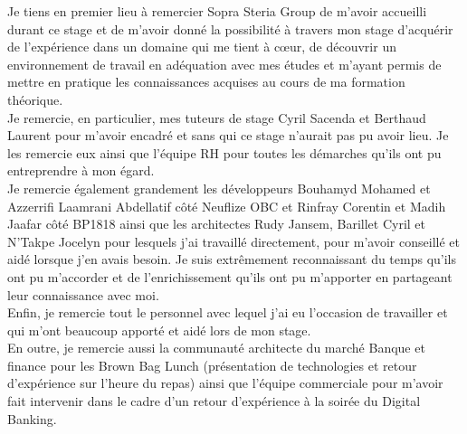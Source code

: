 Je tiens en premier lieu à remercier Sopra Steria Group de m’avoir accueilli durant ce stage et de m’avoir donné la possibilité à travers mon stage d’acquérir de l’expérience dans un domaine qui me tient à cœur, de découvrir un environnement de travail en adéquation avec mes études et m’ayant permis de mettre en pratique les connaissances acquises au cours de ma formation théorique. \\

Je remercie, en particulier, mes tuteurs de stage Cyril Sacenda et Berthaud Laurent pour m’avoir encadré et sans qui ce stage n’aurait pas pu avoir lieu. Je les remercie eux ainsi que l'équipe RH pour toutes les démarches qu’ils ont pu entreprendre à mon égard. \\

Je remercie également grandement les développeurs Bouhamyd Mohamed et Azzerrifi Laamrani Abdellatif côté Neuflize OBC et Rinfray Corentin et Madih Jaafar côté BP1818 ainsi que les architectes Rudy Jansem, Barillet Cyril et N'Takpe Jocelyn pour lesquels j’ai travaillé directement, pour m’avoir conseillé et aidé lorsque j’en avais besoin. Je suis extrêmement reconnaissant du temps qu’ils ont pu m’accorder et de l’enrichissement qu’ils ont pu m’apporter en partageant leur connaissance avec moi. \\

Enfin, je remercie tout le personnel avec lequel j’ai eu l’occasion de travailler et qui m’ont beaucoup apporté et aidé lors de mon stage. \\

En outre, je remercie aussi la communauté architecte du marché Banque et finance pour les Brown Bag Lunch (présentation de technologies et retour d'expérience sur l'heure du repas) ainsi que l'équipe commerciale pour m'avoir fait intervenir dans le cadre d'un retour d'expérience à la soirée du Digital Banking.